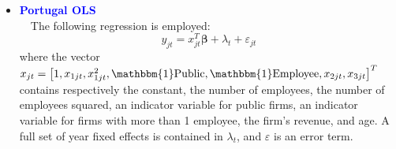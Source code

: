 \documentclass[12pt,notitlepage]{article}
\newcommand{\sym}[1] {\ifmmode^{#1} \else\(^{#1}\) \fi}
\begin{document}
\begin{itemize}
\clearpage
\item \textcolor{blue}{\textbf{Portugal OLS}}\\~\
The following regression is employed:
	\begin{equation}
	y_{jt} = x^{T}_{jt}\mathbf{\beta} + \lambda_{t} + \varepsilon_{jt}
	\end{equation}
where the vector $x_{jt} = \left[  1, x_{1jt}, x^{2}_{1jt}, \mathbbm{1}\text{Public}, \mathbbm{1}\text{Employee}, x_{2jt}, x_{3jt}  \right]^{T} $ contains respectively the constant, the number of employees, the number of employees squared, an indicator variable for public firms, an indicator variable for firms with more than 1 employee, the firm's revenue, and age. A full set of year fixed effects is contained in $\lambda_{t}$, and $\varepsilon$ is an error term.
\begin{table}[htbp]\centering
\def\sym#1{\ifmmode^{#1}\else\(^{#1}\)\fi}
\caption{Haltiwanger growth rate}
\end{table}
\clearpage


\end{itemize}
\end{document}
